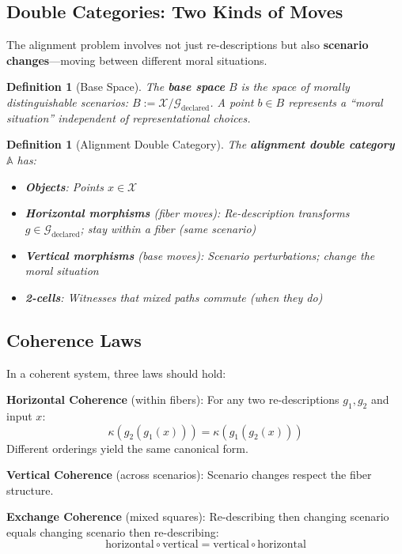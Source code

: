 \documentclass[12pt]{article}
\newtheorem{definition}[theorem]{Definition}
\begin{document}
\subsection{Double Categories: Two Kinds of Moves}

The alignment problem involves not just re-descriptions but also \textbf{scenario changes}---moving between different moral situations.

\begin{definition}[Base Space]
\emph{The \textbf{base space} $B$ is the space of morally distinguishable scenarios: $B := \mathcal{X}/\mathcal{G}_{\mathrm{declared}}$. A point $b \in B$ represents a ``moral situation'' independent of representational choices.}
\end{definition}

\begin{definition}[Alignment Double Category]
\emph{The \textbf{alignment double category} $\mathbb{A}$ has:}
\begin{itemize}
    \item \textbf{\emph{Objects}}: \emph{Points $x \in \mathcal{X}$}
    \item \textbf{\emph{Horizontal morphisms}} \emph{(fiber moves): Re-description transforms $g \in \mathcal{G}_{\mathrm{declared}}$; stay within a fiber (same scenario)}
    \item \textbf{\emph{Vertical morphisms}} \emph{(base moves): Scenario perturbations; change the moral situation}
    \item \textbf{\emph{2-cells}}: \emph{Witnesses that mixed paths commute (when they do)}
\end{itemize}
\end{definition}

\subsection{Coherence Laws}

In a coherent system, three laws should hold:

\textbf{Horizontal Coherence} (within fibers): For any two re-descriptions $g_1, g_2$ and input $x$:
\[
\kappa(g_2(g_1(x))) = \kappa(g_1(g_2(x)))
\]
Different orderings yield the same canonical form.

\textbf{Vertical Coherence} (across scenarios): Scenario changes respect the fiber structure.

\textbf{Exchange Coherence} (mixed squares): Re-describing then changing scenario equals changing scenario then re-describing:
\[
\text{horizontal} \circ \text{vertical} = \text{vertical} \circ \text{horizontal}
\]
\end{document}
